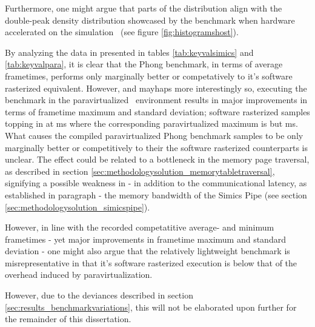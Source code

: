 Furthermore, one might argue that parts of the distribution align with the double-peak density distribution showcased by the benchmark when hardware accelerated on the simulation \dvttermhost\ (see figure \ref{fig:histogramshost}).


By analyzing the data in presented in tables \ref{tab:keyvalsimics} and \ref{tab:keyvalpara}, it is clear that the Phong benchmark, in terms of average frametimes, performs only marginally better or competatively to it's software rasterized equivalent.
However, and mayhaps more interestingly so, executing the benchmark in the paravirtualized \dvttermsimics\ environment results in major improvements in terms of frametime maximum and standard deviation; software rasterized samples topping in at  ms where the corresponding paravirtualized maximum is but  ms.\\

\noindent
What causes the compiled paravirtualized Phong benchmark samples to be only marginally better or competitively to their the software rasterized counterparts is unclear.
The effect could be related to a bottleneck in the memory page traversal, as described in section \ref{sec:methodologysolution_memorytabletraversal}, signifying a possible weakness in - in addition to the communicational latency, as established in paragraph  - the memory bandwidth of the Simics Pipe (see section \ref{sec:methodologysolution_simicspipe}).

However, in line with the recorded competatitive average- and minimum frametimes - yet major improvements in frametime maximum and standard deviation - one might also argue that the relatively lightweight benchmark is misrepresentative in that it's software rasterized execution is below that of the overhead induced by paravirtualization.

However, due to the deviances described in section \ref{sec:results_benchmarkvariations}, this will not be elaborated upon further for the remainder of this dissertation.




